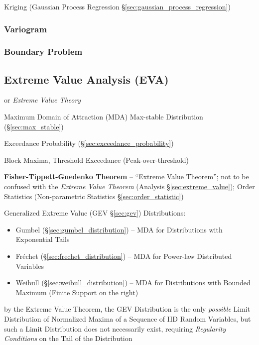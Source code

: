 Kriging (Gaussian Process Regression \S\ref{sec:gaussian_process_regression})



\subsubsection{Variogram}\label{sec:variogram}

\subsubsection{Boundary Problem}\label{sec:boundary_problem}



\subsection{Extreme Value Analysis (EVA)}\label{sec:eva}

or \emph{Extreme Value Theory}

Maximum Domain of Attraction (MDA) \fist Max-stable Distribution
(\S\ref{sec:max_stable})

Exceedance Probability (\S\ref{sec:exceedance_probability})

Block Maxima, Threshold Exceedance (Peak-over-threshold)

\textbf{Fisher-Tippett-Gnedenko Theorem} -- ``Extreme Value Theorem''; not to be
confused with the \emph{Extreme Value Theorem} (Analysis
\S\ref{sec:extreme_value}); Order Statistics (Non-parametric Statistics
\S\ref{sec:order_statistic})

Generalized Extreme Value (GEV \S\ref{sec:gev}) Distributions:
\begin{itemize}
  \item Gumbel (\S\ref{sec:gumbel_distribution}) -- MDA for Distributions with
    Exponential Tails
  \item Fr\'echet (\S\ref{sec:frechet_distribution}) -- MDA for Power-law
    Distributed Variables
  \item Weibull (\S\ref{sec:weibull_distribution}) -- MDA for Distributions with
    Bounded Maximum (Finite Support on the right)
\end{itemize}

by the Extreme Value Theorem, the GEV Distribution is the only \emph{possible}
Limit Distribution of Normalized Maxima of a Sequence of IID Random Variables,
but such a Limit Distribution does not necessarily exist, requiring
\emph{Regularity Conditions} on the Tail of the Distribution

